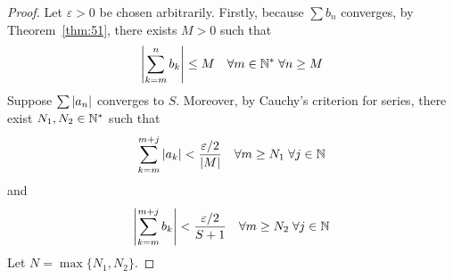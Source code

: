 \documentclass[thmcnt=section, 12pt]{my-elegantbook}
\begin{document}
\begin{proof}
    Let $\varepsilon > 0$ be chosen arbitrarily. Firstly, because $\sum b_n$ converges, by Theorem~\ref{thm:51}, there exists $M > 0$ such that
    \begin{align}
        \left\lvert \sum_{k=m}^n b_k \right\rvert \leq M
        \quad \forall m \in \mathbb{N}^\ast \; 
        \forall n \geq M
        \label{eq:112}
    \end{align}
    Suppose $\sum \left\lvert a_n \right\rvert$ converges to $S$. Moreover, by Cauchy's criterion for series, there exist $N_1, N_2 \in \mathbb{N}^\ast$ such that 
    \begin{align}
        \sum_{k=m}^{m+j} \left\lvert a_k \right\rvert
        < \frac{\varepsilon / 2}{\left\lvert M \right\rvert}
        \quad
        \forall m \geq N_1 \; 
        \forall j \in \mathbb{N}
        \label{eq:110}
    \end{align}
    and
    \begin{align}
        \left\lvert \sum_{k=m}^{m+j} b_k \right\rvert
        < \frac{\varepsilon / 2}{S + 1}
        \quad
        \forall m \geq N_2 \; 
        \forall j \in \mathbb{N}
        \label{eq:111}
    \end{align}
    Let $N = \max \{N_1, N_2\}$.


\end{proof}
\end{document}
